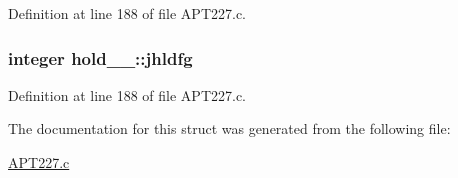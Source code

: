 Definition at line 188 of file A\+P\+T227.\+c.

\subsubsection[{\texorpdfstring{jhldfg}{jhldfg}}]{\setlength{\rightskip}{0pt plus 5cm}integer hold\+\_\+\_\+\+::jhldfg}\hypertarget{structhold__1___a2c760b53520efd9c5e0c3c23e8176c59}{}\label{structhold__1___a2c760b53520efd9c5e0c3c23e8176c59}


Definition at line 188 of file A\+P\+T227.\+c.



The documentation for this struct was generated from the following file\+:\begin{DoxyCompactItemize}
\item 
\hyperlink{APT227_8c}{A\+P\+T227.\+c}\end{DoxyCompactItemize}
